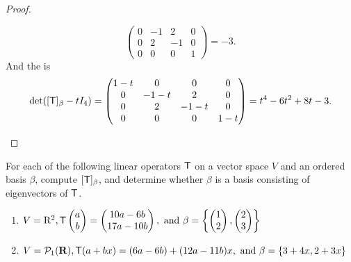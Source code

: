 \begin{proof}
\begin{enumerate}
\[\begin{pmatrix}
        0 & -1 & 2 & 0 \\
        0 & 2 & -1 & 0 \\
        0 & 0 & 0 & 1
    \end{pmatrix} = -3.
\]
And the \CPOLY{} is
\[
    \det([\textsf{T}]_{\beta} - t I_4) = \begin{pmatrix}
        1-t & 0 & 0 & 0 \\
        0 & -1-t & 2 & 0 \\
        0 & 2 & -1-t & 0 \\
        0 & 0 & 0 & 1-t
    \end{pmatrix} = t^4 - 6t^2 + 8t - 3.
\]
\end{enumerate}
\end{proof}

\begin{exercise} \label{exercise 5.1.3}
For each of the following linear operators \(\textsf{T}\) on a vector space \(V\) and an ordered basis \(\beta\), compute \([\textsf{T}]_{\beta}\), and determine whether \(\beta\) is a basis
consisting of eigenvectors of \(\textsf{T}\).

\begin{enumerate}
\item
\(
    V = \mathrm{R}^{2}, \textsf{T}\begin{pmatrix}a \\ b\end{pmatrix}=\begin{pmatrix}10 a-6 b \\ 17 a-10 b\end{pmatrix} , \text{ and } \beta=\left\{\begin{pmatrix}1 \\ 2\end{pmatrix},\begin{pmatrix}2 \\ 3\end{pmatrix}\right\}\)

\item
\(
    V=\mathcal{P}_{1}(\mathbf{R}), \textsf{T}(a+b x)=(6 a-6 b)+(12 a-11 b) x ,
    \text{ and } \beta=\{3+4 x, 2+3 x\}
\)


\end{enumerate}
\end{exercise}
